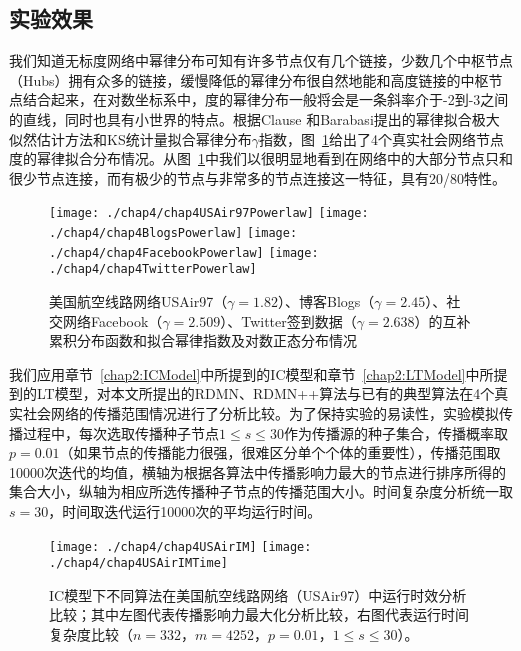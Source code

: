 \subsection{实验效果}
我们知道无标度网络中幂律分布可知有许多节点仅有几个链接，少数几个中枢节点（Hubs）拥有众多的链接，缓慢降低的幂律分布很自然地能和高度链接的中枢节点结合起来，在对数坐标系中，度的幂律分布一般将会是一条斜率介于-2到-3之间的直线，同时也具有小世界的特点。根据Clause\cite{clauset2009power} 和Barabasi\cite{albert1999internet}提出的幂律拟合极大似然估计方法和KS统计量拟合幂律分布$\gamma$指数，图~\ref{fig:chap4Powerlaw}给出了4个真实社会网络节点度的幂律拟合分布情况。从图~\ref{fig:chap4Powerlaw}中我们以很明显地看到在网络中的大部分节点只和很少节点连接，而有极少的节点与非常多的节点连接这一特征，具有20/80特性\cite{sen1970impossibility,chang2000liberal,newman2005power}。
\begin{figure}[H]
	\centering%
	\subcaptionbox{\label{fig:chap4USAir97Powerlaw}}
	{\texttt{[image: ./chap4/chap4USAir97Powerlaw]}}
	\subcaptionbox{\label{fig:chap4BlogsPowerlaw}}
	{\texttt{[image: ./chap4/chap4BlogsPowerlaw]}}
	\subcaptionbox{\label{fig:chap4FacebookPowerlaw}}
	{\texttt{[image: ./chap4/chap4FacebookPowerlaw]}}
	\subcaptionbox{\label{fig:chap4TwitterPowerlaw}}
	{\texttt{[image: ./chap4/chap4TwitterPowerlaw]}}
	\caption{美国航空线路网络USAir97（$\gamma=1.82$）、博客Blogs（$\gamma=2.45$）、社交网络Facebook（$\gamma=2.509$）、Twitter签到数据（$\gamma=2.638$）的互补累积分布函数和拟合幂律指数及对数正态分布情况}
	\label{fig:chap4Powerlaw}
\end{figure}

我们应用章节~\ref{chap2:ICModel}中所提到的IC模型和章节~\ref{chap2:LTModel}中所提到的LT模型，对本文所提出的RDMN、RDMN++算法与已有的典型算法在4个真实社会网络的传播范围情况进行了分析比较。为了保持实验的易读性，实验模拟传播过程中，每次选取传播种子节点$1\leq s\leq 30$作为传播源的种子集合，传播概率取$p=0.01$（如果节点的传播能力很强，很难区分单个个体的重要性），传播范围取10000次迭代的均值，横轴为根据各算法中传播影响力最大的节点进行排序所得的集合大小，纵轴为相应所选传播种子节点的传播范围大小。时间复杂度分析统一取$s=30$，时间取迭代运行10000次的平均运行时间。
\begin{figure}[H]
	\centering%
	\subcaptionbox{\label{fig:chap4USAirIM}}
	{\texttt{[image: ./chap4/chap4USAirIM]}}
	\subcaptionbox{\label{fig:chap4USAirIMTime}}
	{\texttt{[image: ./chap4/chap4USAirIMTime]}}
	\caption{IC模型下不同算法在美国航空线路网络（USAir97）中运行时效分析比较；其中左图代表传播影响力最大化分析比较，右图代表运行时间复杂度比较（$n=332$，$m=4252$，$p=0.01$，$1\leq s\leq 30$）。}
	\label{fig:chap4USAirIc}
\end{figure}

